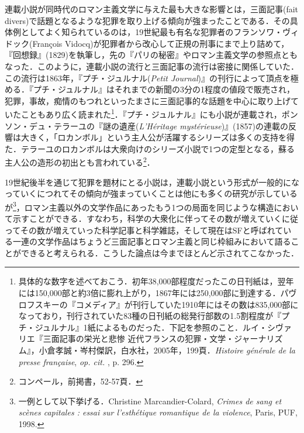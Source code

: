 連載小説が同時代のロマン主義文学に与えた最も大きな影響とは，三面記事(fait divers)で話題となるような犯罪を取り上げる傾向が強まったことである．その具体例としてよく知られているのは，19世紀最も有名な犯罪者のフランソワ・ヴィドック(François Vidocq)が犯罪者から改心して正規の刑事にまで上り詰めて，『回想録』(1829)を執筆し，先の『パリの秘密』やロマン主義文学の参照点ともなった．このように，連載小説の流行と三面記事の流行は密接に関係していた．この流行は1863年，『プチ・ジュルナル(\emph{Petit Journal})』の刊行によって頂点を極める．『プチ・ジュルナル』はそれまでの新聞の3分の1程度の値段で販売され，犯罪，事故，痴情のもつれといったまさに三面記事的な話題を中心に取り上げていたこともあり広く読まれた\footnote{具体的な数字を述べておこう．初年38,000部程度だったこの日刊紙は，翌年には150,000部と約3倍に膨れ上がり，1867年には250,000部に到達する．パヴロフスキーの『コメディア』が刊行していた1910年にはその数は835,000部になっており，刊行されていた83種の日刊紙の総発行部数の1.5割程度が『プチ・ジュルナル』1紙によるものだった．下記を参照のこと．ルイ・シヴァリエ『三面記事の栄光と悲惨 近代フランスの犯罪・文学・ジャーナリズム』，小倉孝誠・岑村傑訳，白水社，2005年，199頁．\emph{Histoire générale de la presse française}, \emph{op. cit.} , p. 296.}．『プチ・ジュルナル』にも小説が連載され，ポンソン・デュ・テラーユの『謎の遺産(\emph{L'Héritage mystérieuse})』(1857)の連載の反響は大きく，「ロカンボル」という主人公が活躍するシリーズは多くの支持を得た．テラーユのロカンボルは大衆向けのシリーズ小説で1つの定型となる，蘇る主人公の造形の初出とも言われている\footnote{コンペール，前掲書，52-57頁．}．

19世紀後半を通じて犯罪を題材にとる小説は，連載小説という形式が一般的になっていくにつれてその傾向が強まっていくことは他にも多くの研究が示しているが\footnote{一例として以下挙げる．Christine Marcandier-Colard, \emph{Crimes de sang et scènes capitales : essai sur l'esthétique romantique de la violence}, Paris, PUF, 1998. }，ロマン主義以外の文学作品にあったもう1つの局面を同じような構造において示すことができる．すなわち，科学の大衆化に伴ってその数が増えていくに従ってその数が増えていった科学記事と科学雑誌，そして現在はSFと呼ばれている一連の文学作品はちょうど三面記事とロマン主義と同じ枠組みにおいて語ることができると考えられる．こうした論点は今までほとんど示されてこなかった．

